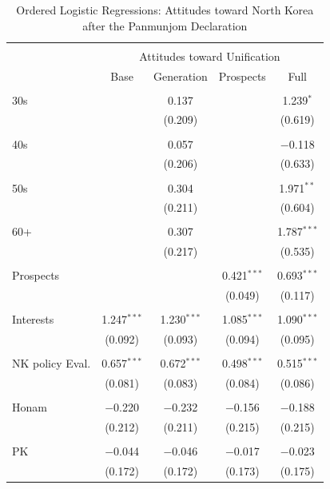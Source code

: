 \documentclass[letterpaper,9pt,twocolumn,twoside,]{pinp}
\begin{document}
\begin{table}[!htbp] \centering 
  \caption{Ordered Logistic Regressions: Attitudes toward North Korea after the Panmunjom Declaration} 
  \label{tab2} 
\begin{tabular}{@{\extracolsep{5pt}}lcccc} 
\\[-1.8ex]\hline 
\hline \\[-1.8ex] 
 & \multicolumn{4}{c}{Attitudes toward Unification} \\ 
\cline{2-5} 
 & Base & Generation & Prospects & Full \\ 
\hline \\[-1.8ex] 
 30s &  & 0.137 &  & 1.239$^{*}$ \\ 
  &  & (0.209) &  & (0.619) \\ 
  & & & & \\ 
 40s &  & 0.057 &  & $-$0.118 \\ 
  &  & (0.206) &  & (0.633) \\ 
  & & & & \\ 
 50s &  & 0.304 &  & 1.971$^{**}$ \\ 
  &  & (0.211) &  & (0.604) \\ 
  & & & & \\ 
 60+ &  & 0.307 &  & 1.787$^{***}$ \\ 
  &  & (0.217) &  & (0.535) \\ 
  & & & & \\ 
 Prospects &  &  & 0.421$^{***}$ & 0.693$^{***}$ \\ 
  &  &  & (0.049) & (0.117) \\ 
  & & & & \\ 
 Interests & 1.247$^{***}$ & 1.230$^{***}$ & 1.085$^{***}$ & 1.090$^{***}$ \\ 
  & (0.092) & (0.093) & (0.094) & (0.095) \\ 
  & & & & \\ 
 NK policy Eval. & 0.657$^{***}$ & 0.672$^{***}$ & 0.498$^{***}$ & 0.515$^{***}$ \\ 
  & (0.081) & (0.083) & (0.084) & (0.086) \\ 
  & & & & \\ 
 Honam & $-$0.220 & $-$0.232 & $-$0.156 & $-$0.188 \\ 
  & (0.212) & (0.211) & (0.215) & (0.215) \\ 
  & & & & \\ 
 PK & $-$0.044 & $-$0.046 & $-$0.017 & $-$0.023 \\ 
  & (0.172) & (0.172) & (0.173) & (0.175) \\ 

\end{tabular}
\end{table}
\end{document}
